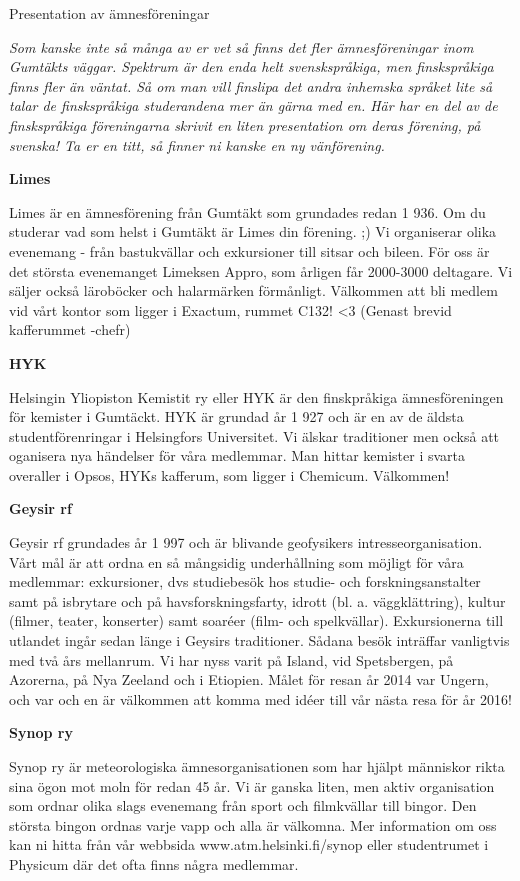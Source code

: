 \documentclass{spektraklet}
\begin{document}
\begin{artikel}{Presentation av ämnesföreningar}{}

\textit{Som kanske inte så många av er vet så finns det fler ämnesföreningar inom Gumtäkts
väggar. Spektrum är den enda helt svenskspråkiga, men finskspråkiga finns fler än väntat. Så
om man vill finslipa det andra inhemska språket lite så talar de finskspråkiga studerandena
mer än gärna med en. Här har en del av de finskspråkiga föreningarna skrivit en liten
presentation om deras förening, på svenska! Ta er en titt, så finner ni kanske en ny
vänförening.}

\textbf{Limes}

Limes är en ämnesförening från Gumtäkt som grundades redan 1 936.
Om du studerar vad som helst i Gumtäkt är Limes din förening. ;)
Vi organiserar olika evenemang - från bastukvällar och exkursioner till sitsar och bileen.
För oss är det största evenemanget Limeksen Appro, som årligen får 2000-3000 deltagare.
Vi säljer också läroböcker och halarmärken förmånligt.
Välkommen att bli medlem vid vårt kontor som ligger i Exactum, rummet C132! <3
(Genast brevid kafferummet -chefr)

\textbf{HYK}

Helsingin Yliopiston Kemistit ry eller HYK är den finskpråkiga ämnesföreningen för kemister i Gumtäckt.
HYK är grundad år 1 927 och är en av de äldsta studentförenringar i Helsingfors
Universitet.
Vi älskar traditioner men också att oganisera nya händelser för våra medlemmar.
Man hittar kemister i svarta overaller i Opsos, HYKs kafferum, som ligger i Chemicum.
Välkommen!

\textbf{Geysir rf}

Geysir rf grundades år 1 997 och är blivande geofysikers intresseorganisation. Vårt mål är att ordna en så mångsidig underhållning som möjligt för våra medlemmar: exkursioner,
dvs studiebesök hos studie- och forskningsanstalter samt på isbrytare och på havsforskningsfarty, idrott (bl. a. väggklättring), kultur (filmer, teater, konserter) samt soaréer (film- och spelkvällar). Exkursionerna till utlandet ingår sedan länge i Geysirs traditioner. Sådana besök inträffar vanligtvis med två års mellanrum. Vi har nyss varit på Island, vid Spetsbergen, på Azorerna, på Nya Zeeland och i Etiopien. Målet för resan år 2014 var Ungern, och var och en är välkommen att komma med idéer till vår nästa resa för år 2016!

\textbf{Synop ry}

Synop ry är meteorologiska ämnesorganisationen som har hjälpt människor rikta sina
ögon mot moln för redan 45 år. Vi är ganska liten, men aktiv organisation som ordnar olika
slags evenemang från sport och filmkvällar till bingor. Den största bingon ordnas varje vapp
och alla är välkomna. Mer information om oss kan ni hitta från vår webbsida www.atm.helsinki.fi/synop eller studentrumet i Physicum där det ofta finns några medlemmar.


\end{artikel}
\end{document}
